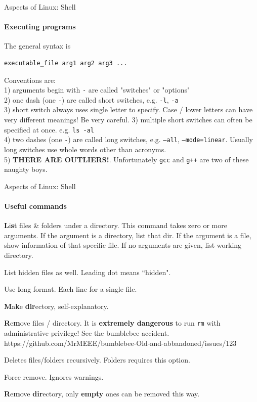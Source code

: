 \begin{frame}[fragile]{Aspects of Linux: Shell}
\framesubtitle{Executing programs}
The general syntax is 
\begin{verbatim}
executable_file arg1 arg2 arg3 ...
\end{verbatim}
Conventions are:\\
1) arguments begin with \texttt{-} are called "switches" or "options" \\
2) one dash (one \texttt{-}) are called short switches, e.g. \texttt{-l}, \texttt{-a}\\
3) short switch always uses single letter to specify. Case / lower letters can have very different meanings! Be very careful.
3) multiple short switches can often be specified at once. e.g. \texttt{ls -al}\\
4) two dashes (one \texttt{-}) are called long switches, e.g. \texttt{--all}, \texttt{--mode=linear}. Usually long switches use whole words other than acronyms.\\
5) \textbf{THERE ARE OUTLIERS!}. Unfortunately \texttt{gcc} and \texttt{g++} are two of these naughty boys. 
\end{frame}

\begin{frame}{Aspects of Linux: Shell}
\framesubtitle{Useful commands}
	\begin{description}[mkdir]
		\item[ls] \textbf{L}i\textbf{s}t files \& folders under a directory. This command takes zero or more arguments. If the argument is a directory, list that dir. If the argument is a file, show information of that specific file. If no arguments are given, list working directory.
		\begin{description}[-a]
			\small
			\item[-a] List hidden files as well. Leading dot means ``hidden".
			\item[-l] Use \textbf{l}ong format. Each line for a single file. 
		\end{description}
		\item[mkdir] \textbf{M}a\textbf{k}e \textbf{dir}ectory, self-explanatory.
		\item[rm] \textbf{R}e\textbf{m}ove files / directory. It is \textbf{extremely dangerous} to run \texttt{rm} with administrative privilege! See the bumblebee accident. \small{https://github.com/MrMEEE/bumblebee-Old-and-abbandoned/issues/123}
		\begin{description}[-a]
			\small
			\item[-r] Deletes files/folders recursively. Folders requires this option.
			\item[-f] Force remove. Ignores warnings.  
		\end{description}
		\item[rmdir] \textbf{R}e\textbf{m}ove \textbf{dir}ectory, only \textbf{empty} ones can be removed this way.
	\end{description}

\end{frame}

